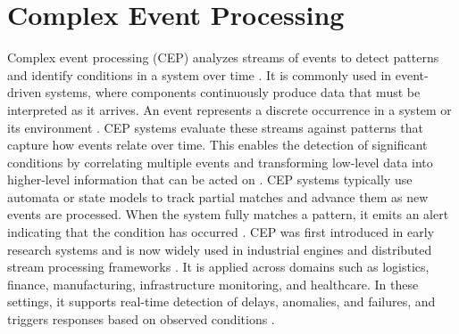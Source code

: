\section{Complex Event Processing}\label{sec:background-cep}
Complex event processing (CEP) analyzes streams of events to detect patterns and identify conditions in a system over time \cite{cugola2015complex}. It is commonly used in event-driven systems, where components continuously produce data that must be interpreted as it arrives. An event represents a discrete occurrence in a system or its environment \cite{etzion2010event}. CEP systems evaluate these streams against patterns that capture how events relate over time. This enables the detection of significant conditions by correlating multiple events and transforming low-level data into higher-level information that can be acted on \cite{cugola2012processing}. CEP systems typically use automata or state models to track partial matches and advance them as new events are processed. When the system fully matches a pattern, it emits an alert indicating that the condition has occurred \cite{cugola2015complex}. CEP was first introduced in early research systems and is now widely used in industrial engines and distributed stream processing frameworks \cite{cugola2012processing}. It is applied across domains such as logistics, finance, manufacturing, infrastructure monitoring, and healthcare. In these settings, it supports real-time detection of delays, anomalies, and failures, and triggers responses based on observed conditions \cite{dayarathna2018recent}.